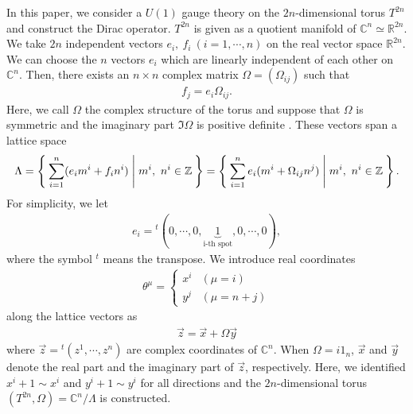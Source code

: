 \documentclass[11pt]{article}
\begin{document}
In this paper, we consider a $U(1)$ gauge theory on the $2n$-dimensional torus $T^{2n}$ and construct the Dirac operator. $T^{2n}$ is given as a quotient manifold of $\mathbb{C}^n \simeq \mathbb{R}^{2n}$. We take $2n$ independent vectors $e_{i},~f_i~(i=1,\cdots,n)$ on the real vector space $\mathbb{R}^{2n}$. We can choose the $n$ vectors $e_i$ which are linearly independent of each other on $\mathbb{C}^n$. Then, there exists an $n\times n$ complex matrix $\Omega=(\Omega_{ij})$ such that 
\begin{align}
    f_j= e_i \Omega_{ij}.
\end{align}
Here, we call $\Omega$ the complex structure of the torus and suppose that $\Omega$ is symmetric and the imaginary part $\Im \Omega$ is positive definite \cite{mumford2007tata}%
. 
These vectors span a lattice space
\begin{align}
    \Lambda= \Set{ \sum_{i=1}^{n} ( e_i m^i+  f_i n^i)  | m^i,~n^i \in \mathbb{Z}}=\Set{ \sum_{i=1}^{n}  e_i( m^i+  \Omega_{ij} n^j)  | m^i,~n^i \in \mathbb{Z}}.
\end{align}
For simplicity, we let
\begin{align}
    e_i={}^t (0, \cdots, 0,\underbrace{1}_{ \text{i-th spot}},0, \cdots, 0),
\end{align}
where the symbol ${}^t$ means the transpose. We introduce real coordinates 
\begin{align}
    \theta^\mu= \left\{
\begin{array}{ll}
x^i & (\mu=i) \\
y^j & (\mu=n+j)
\end{array}
\right.
\end{align}
along the lattice vectors as
\begin{align}
    \vec{z}=\vec{x} + \Omega \vec{y} 
\end{align}
where $\vec{z}={}^t(z^1,\cdots ,z^n)$ are complex coordinates of $\mathbb{C}^n$. When $\Omega=i 1_n$, $\vec{x}$ and $\vec{y}$ denote the real part and the imaginary part of $\vec{z}$, respectively. 
Here, we identified $x^i+1 \sim x^i$ and $y^i +1 \sim y^i$ for all directions and the $2n$-dimensional torus $(T^{2n},\Omega)=\mathbb{C}^n/ \Lambda$ is constructed. 
\end{document}

